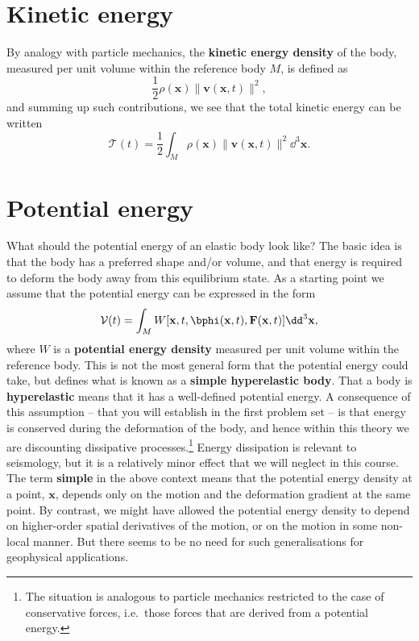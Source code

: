 \section*{Kinetic energy}
By analogy with particle mechanics, the \textbf{kinetic energy density} of the body, measured per unit volume within the reference body $M$, is defined as
\begin{equation}
\frac{1}{2}\rho(\mathbf{x})\|\mathbf{v}(\mathbf{x},t)\|^{2},
\label{eq:14}
\end{equation}
and summing up such contributions, we see that the total kinetic energy can be written
\begin{equation}
\mathcal{T}(t)=\frac{1}{2}\int_{M}\rho(\mathbf{x})\|\mathbf{v}(\mathbf{x},t)\|^{2}\dd^{3}\mathbf{x}.
\label{eq:15}
\end{equation}


\section*{Potential energy}
What should the potential energy of an elastic body look like? The basic idea is that the body has a preferred shape and/or volume, 
and that energy is required to deform the body away from this equilibrium state. As a starting point we assume that the 
potential energy can be expressed in the form
\begin{equation}
\mathcal{V}(t)=\int_{M}W[\mathbf{x},t,\bphi(\mathbf{x},t),\mathbf{F}(\mathbf{x},t)]\dd^{3}\mathbf{x},
\label{eq:16}
\end{equation}
where $W$ is a \textbf{potential energy density} measured per unit volume within the reference body. This is not the most general form 
that the potential energy could take, but defines what is known as a \textbf{simple hyperelastic body}. That a body is 
\textbf{hyperelastic} means that it has a well-defined potential energy. A consequence of this assumption -- that you will establish 
in the first problem set -- is that energy is conserved during the deformation of the body, and hence within this theory
we are discounting dissipative processes.\footnote{The situation is analogous to particle mechanics restricted to the case of 
conservative forces, i.e.\ those forces that are derived from a potential energy.}
Energy dissipation is relevant to seismology, but it 
is a relatively minor effect that we will neglect in this course. The term \textbf{simple} in the above context means that the 
potential energy density at a point, $\mathbf{x}$, depends only on the motion and the deformation gradient at the same point. 
By contrast, we might have allowed the potential energy density to depend on higher-order spatial derivatives of the motion, 
or on the motion in some non-local manner. But there seems to be no need for such generalisations for geophysical 
applications. 


